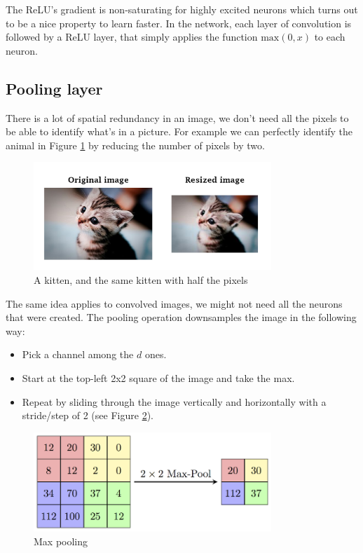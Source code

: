 The ReLU's gradient is non-saturating for highly excited neurons which turns out to be a nice property to learn faster. In the network, each layer of convolution is followed by a ReLU layer, that simply applies the function $\text{max}(0,x)$ to each neuron.

\newpage
\subsection{Pooling layer}
There is a lot of spatial redundancy in an image, we don't need all the pixels to be able to identify what's in a picture. For example we can perfectly identify the animal in Figure \ref{kittens} by reducing the number of pixels by two.

\begin{figure}[H]
\centering
\includegraphics[width=0.8\textwidth]{Images/kittens.png}
\caption{A kitten, and the same kitten with half the pixels}
\label{kittens}
\end{figure}

The same idea applies to convolved images, we might not need all the neurons that were created. The pooling operation downsamples the image in the following way:
\begin{itemize}
    \item Pick a channel among the $d$ ones.
    \item Start at the top-left 2x2 square of the image and take the max.
    \item Repeat by sliding through the image vertically and horizontally with a stride/step of 2 (see Figure \ref{maxpool}).
\end{itemize}

\begin{figure}[H]
\centering
\includegraphics[width=0.8\textwidth]{Images/maxpool.png}
\caption{Max pooling \cite{camb-spark}}
\label{maxpool}
\end{figure}

